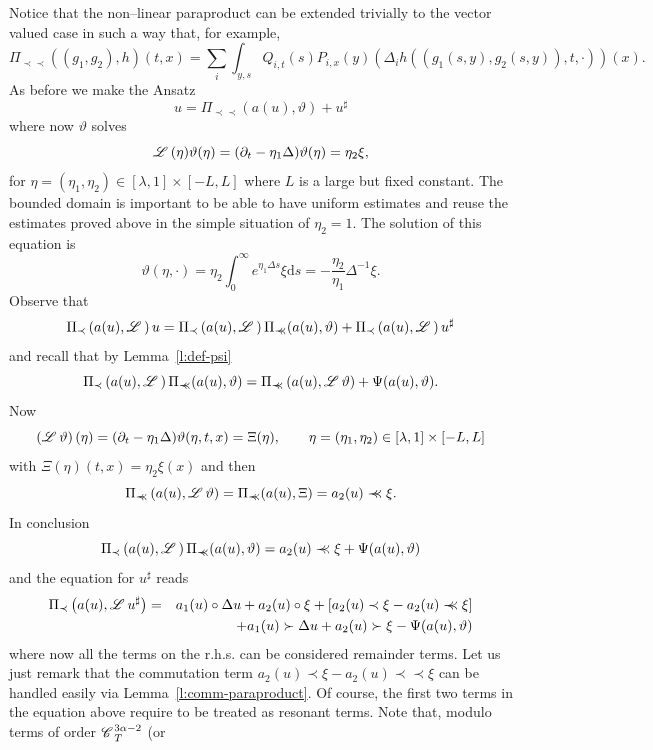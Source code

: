 \documentclass{amsart}
\newcommand{\mathd}{\mathrm{d}}
\newcommand{\precprec}{\prec\!\!\!\prec}
\theoremstyle{remark}
\theoremstyle{definition}
\newcommand{\CC}{\mathscr{C} \hspace{.1em}}
\newcommand{\LL}{\mathscr{L} \hspace{.2em}}
\begin{document}
Notice that the non--linear paraproduct can be extended trivially to the
vector valued case in such a way that, for example,
\[ \Pi_{\precprec} ((g_1, g_2), h) (t, x) = \sum_i \int_{y, s} Q_{i, t} (s)
   P_{i, x} (y) (\Delta_i h ((g_1 (s, y), g_2 (s, y)), t, \cdot)) (x) . \]
As before we make the Ansatz
\[ u = \Pi_{\precprec} (a (u), \vartheta) + u^{\sharp} \]
where now $\vartheta$ solves
\[ \LL (\eta) \vartheta (\eta) = (\partial_t - \eta_1 \Delta) \vartheta (\eta)
   = \eta_2 \xi, \]
for $\eta = (\eta_1, \eta_2) \in [\lambda, 1] \times [- L, L]$ where $L$ is a
large but fixed constant. The bounded domain is important to be able to have
uniform estimates and reuse the estimates proved above in the simple situation
of $\eta_2 = 1$. The solution of this equation is
\[ \vartheta (\eta, \cdot) = \eta_2 \int_0^{\infty} e^{\eta_1 \Delta s} \xi
   \mathd s = - \frac{\eta_2}{\eta_1} \Delta^{- 1} \xi . \]
Observe that
\[ \Pi_{\prec} \left( a (u), \LL \right) u = \Pi_{\prec} \left( a (u), \LL
   \right) \Pi_{\precprec} (a (u), \vartheta) + \Pi_{\prec} \left( a (u), \LL
   \right) u^{\sharp} \]
and recall that by Lemma~\ref{l:def-psi}
\[ \Pi_{\prec} \left( a (u), \LL \right) \Pi_{\precprec} (a (u), \vartheta) =
   \Pi_{\precprec} \left( a (u), \LL \vartheta \right) + \Psi (a (u),
   \vartheta) . \]
Now
\[ \left( \LL \vartheta \right) (\eta) = (\partial_t - \eta_1 \Delta)
   \vartheta (\eta, t, x) = \Xi (\eta), \qquad \eta = (\eta_1, \eta_2) \in
   [\lambda, 1] \times [- L, L] \]
with $\Xi (\eta) (t, x) = \eta_2 \xi (x)$ and then
\[ \Pi_{\precprec} \left( a (u), \LL \vartheta \right) = \Pi_{\precprec} (a
   (u), \Xi) = a_2 (u) \precprec \xi . \]
In conclusion
\[ \Pi_{\prec} \left( a (u), \LL \right) \Pi_{\precprec} (a (u), \vartheta) =
   a_2 (u) \precprec \xi + \Psi (a (u), \vartheta) \]
and the equation for $u^{\sharp}$ reads
\begin{eqnarray}
  \Pi_{\prec} \left( a (u), \LL u^{\sharp} \right) & = & a_1 (u) \circ \Delta
  u + a_2 (u) \circ \xi + [a_2 (u) \prec \xi - a_2 (u) \precprec \xi]
  \nonumber\\
  &  & + a_1 (u) \succ \Delta u + a_2 (u) \succ \xi - \Psi (a (u), \vartheta)
  \nonumber
\end{eqnarray}
where now all the terms on the r.h.s. can be considered remainder terms. Let
us just remark that the commutation term $a_2 (u) \prec \xi - a_2 (u)
\precprec \xi$ can be handled easily via Lemma~\ref{l:comm-paraproduct}. Of
course, the first two terms in the equation above require to be treated as
resonant terms. Note that, modulo terms of order $\CC^{3 \alpha - 2}_T$ (or
\end{document}
